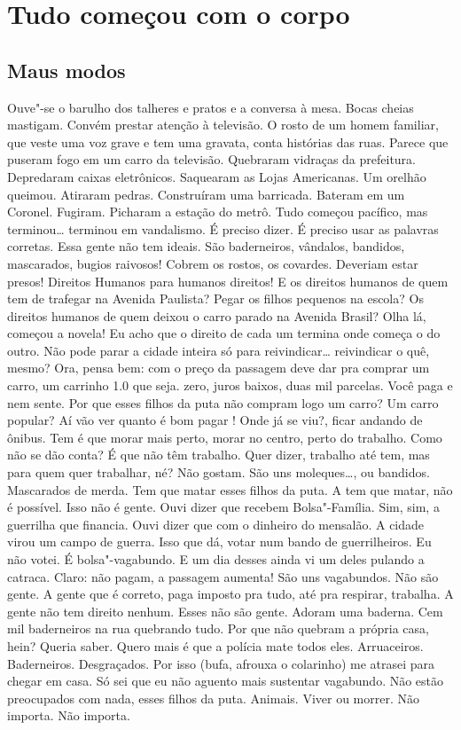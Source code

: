 \section{Tudo começou com o corpo}

\subsection{Maus modos}

Ouve"-se o barulho dos talheres e pratos e a
conversa à mesa. Bocas cheias mastigam. Convém prestar atenção à
televisão. O rosto de um homem familiar, que veste uma voz grave e tem
uma gravata, conta histórias das ruas. Parece que puseram fogo em um
carro da televisão. Quebraram vidraças da prefeitura. Depredaram caixas
eletrônicos. Saquearam as Lojas Americanas. Um orelhão queimou. Atiraram
pedras. Construíram uma barricada. Bateram em um Coronel. Fugiram.
Picharam a estação do metrô. Tudo começou pacífico, mas terminou\ldots{}
terminou em vandalismo. É preciso dizer. É preciso usar as palavras
corretas. Essa gente não tem ideais. São baderneiros, vândalos,
bandidos, mascarados, bugios raivosos! Cobrem os rostos, os covardes.
Deveriam estar presos! Direitos Humanos para humanos direitos! E os
direitos humanos de quem tem de trafegar na Avenida Paulista? Pegar os
filhos pequenos na escola? Os direitos humanos de quem deixou o carro
parado na Avenida Brasil? Olha lá, começou a novela! Eu acho que o
direito de cada um termina onde começa o do outro. Não pode parar a
cidade inteira só para reivindicar\ldots{} reivindicar o quê, mesmo? Ora,
pensa bem: com o preço da passagem deve dar pra comprar um carro, um
carrinho 1.0 que seja.  zero, juros baixos, duas mil parcelas. Você
paga e nem sente. Por que esses filhos da puta não compram logo um
carro? Um carro popular? Aí vão ver quanto é bom pagar ! Onde já se
viu?, ficar andando de ônibus. Tem é que morar mais perto, morar no
centro, perto do trabalho. Como não se dão conta? É que não têm
trabalho. Quer dizer, trabalho até tem, mas para quem quer trabalhar,
né? Não gostam. São uns moleques\ldots{}, ou bandidos. Mascarados de merda.
Tem que matar esses filhos da puta. A  tem que matar, não é possível.
Isso não é gente. Ouvi dizer que recebem Bolsa"-Família. Sim, sim, a
guerrilha que financia. Ouvi dizer que com o dinheiro do mensalão. A
cidade virou um campo de guerra. Isso que dá, votar num bando de
guerrilheiros. Eu não votei. É bolsa"-vagabundo. E um dia desses ainda vi
um deles pulando a catraca. Claro: não pagam, a passagem aumenta! São
uns vagabundos. Não são gente. A gente que é correto, paga imposto pra
tudo, até pra respirar, trabalha. A gente não tem direito nenhum. Esses
não são gente. Adoram uma baderna. Cem mil baderneiros na rua quebrando
tudo. Por que não quebram a própria casa, hein? Queria saber. Quero mais
é que a polícia mate todos eles. Arruaceiros. Baderneiros. Desgraçados.
Por isso (bufa, afrouxa o colarinho) me atrasei para chegar em casa. Só
sei que eu não aguento mais sustentar vagabundo. Não estão preocupados
com nada, esses filhos da puta. Animais. Viver ou morrer. Não importa.
Não importa.

